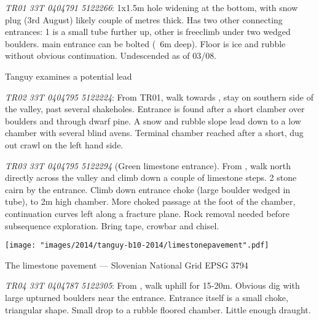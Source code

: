 	
\begin{citemize}
	\item \emph{TR01 33T 0404791 5122266}: 1x1.5m hole widening at the bottom, with snow plug (3rd August) likely couple of metres thick. Has two other connecting entrances: 1 is a small tube further up, other is freeclimb under two wedged boulders. main entrance can be bolted (~6m deep). Floor is ice and rubble without obvious continuation. Undescended as of 03/08.
 
\begin{marginfigure}
        		\centering
        		\caption{Tanguy examines a potential lead }
		\label{cave in pavement}
        \end{marginfigure}

	\item \emph{TR02 33T 0404795 5122224}: From TR01, walk towards , stay on southern side of the valley, past several shakeholes. Entrance is found after a short clamber over boulders and through dwarf pine.  A snow and rubble slope lead down to a low chamber with several blind avens. Terminal chamber reached after a short, dug out crawl on the left hand side.

	\item \emph{TR03 33T 0404795 5122294} (Green limestone entrance). From , walk north directly across the valley and climb down a couple of limestone steps. 2 stone cairn by the entrance.  Climb down entrance choke (large boulder wedged in tube), to 2m high chamber. More choked passage at the foot of the chamber, continuation curves left along a fracture plane. Rock removal needed before subsequence exploration. Bring tape, crowbar and chisel.
	
\begin{pagemap}
	\checkoddpage \ifoddpage \forcerectofloat \else \forceversofloat \fi
	\centering
	
	\texttt{[image: "images/2014/tanguy-b10-2014/limestonepavement".pdf]}
	
	\label{map pavement}
	\caption{The limestone pavement --- Slovenian National Grid EPSG 3794}
\end{pagemap}
	
	\item \emph{TR04 33T 0404787 5122305}: From , walk uphill for 15-20m. Obvious dig with large upturned boulders near the entrance. Entrance itself is a small choke, triangular shape. Small drop to a rubble floored chamber. Little enough draught.


\end{citemize}
